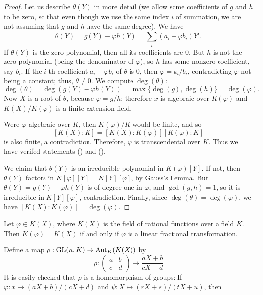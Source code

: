 \begin{proof}
Let us describe $\theta(Y)$ in more detail (we allow some coefficients of $g$ and $h$ to be zero, so that even though we use the same index $i$ of summation, we are not assuming that $g$ and $h$ have the same degree). We have 
\[\theta(Y)=g(Y)-\varphi h(Y)=\sum_i(a_i-\varphi b_i)Y^i.\]
If $\theta(Y)$ is the zero polynomial, then all its coefficients are $0$. But $h$ is not the zero polynomial (being the denominator of $\varphi$), so $h$ has some nonzero coefficient, say $b_i$. If the $i$-th coefficient $a_i-\varphi b_i$ of $\theta$ is $0$, then $\varphi=a_i/b_i$, contradicting $\varphi$ not being a constant; thus, $\theta\neq 0$. We compute $\deg(\theta)$:
\[\deg(\theta)=\deg(g(Y)-\varphi h(Y))=\max\{\deg(g),\deg(h)\}=\deg(\varphi).\]
Now $X$ is a root of $\theta$, because $\varphi=g/h$; therefore $x$ is algebraic over $K(\varphi)$ and $K(X)/K(\varphi)$ is a finite extension field.\par

Were $\varphi$ algebraic over $K$, then $K(\varphi)/K$ would be finite, and so
\[[K(X):K]=[K(X):K(\varphi)][K(\varphi):K]\]
is also finite, a contradiction. Therefore, $\varphi$ is transcendental over $K$. Thus we have verifed statements () and ().\par
We claim that $\theta(Y)$ is an irreducible polynomial in $K(\varphi)[Y]$. If not, then $\theta(Y)$ factors in $K[\varphi][Y]=K[Y][\varphi]$, by Gauss's Lemma. But $\theta(Y)=g(Y)-\varphi h(Y)$ is of degree one in $\varphi$, and $\gcd(g,h)=1$, so it is irreducible in $K[Y][\varphi]$, contradiction. Finally, since $\deg(\theta)=\deg(\varphi)$, we have $[K(X):K(\varphi)]=\deg(\varphi)$.
\end{proof}
\begin{corollary}
Let $\varphi\in K(X)$, where $K(X)$ is the field of rational functions over a field $K$. Then $K(\varphi)=K(X)$ if and only if $\varphi$ is a linear fractional transformation.
\end{corollary}
Define a map $\rho:\mathrm{GL}(n,K)\to\mathrm{Aut}_K(K(X))$ by
\[\rho:\begin{pmatrix}
a&b\\
c&d
\end{pmatrix}\mapsto\frac{aX+b}{cX+d}\]
It is easily checked that $\rho$ is a homomorphism of groups: If $\varphi:x\mapsto(aX+b)/(cX+d)$ and $\psi:X\mapsto(rX+s)/(tX+u)$, then
